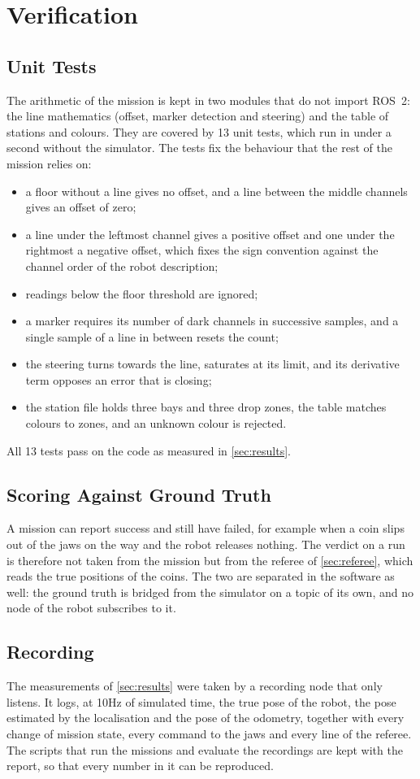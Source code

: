 \section{Verification}
\label{sec:verification}

\subsection{Unit Tests}
The arithmetic of the mission is kept in two modules that do not import ROS~2: the line
mathematics (offset, marker detection and steering) and the table of stations and colours.
They are covered by 13 unit tests, which run in under a second without the simulator. The
tests fix the behaviour that the rest of the mission relies on:
\begin{itemize}
  \item a floor without a line gives no offset, and a line between the middle channels gives
        an offset of zero;
  \item a line under the leftmost channel gives a positive offset and one under the
        rightmost a negative offset, which fixes the sign convention against the channel
        order of the robot description;
  \item readings below the floor threshold are ignored;
  \item a marker requires its number of dark channels in successive samples, and a single
        sample of a line in between resets the count;
  \item the steering turns towards the line, saturates at its limit, and its derivative
        term opposes an error that is closing;
  \item the station file holds three bays and three drop zones, the table matches colours
        to zones, and an unknown colour is rejected.
\end{itemize}
All 13 tests pass on the code as measured in \cref{sec:results}.

\subsection{Scoring Against Ground Truth}
A mission can report success and still have failed, for example when a coin slips out of
the jaws on the way and the robot releases nothing. The verdict on a run is therefore not
taken from the mission but from the referee of \cref{sec:referee}, which reads the true
positions of the coins. The two are separated in the software as well: the ground truth is
bridged from the simulator on a topic of its own, and no node of the robot subscribes to it.

\subsection{Recording}
The measurements of \cref{sec:results} were taken by a recording node that only listens. It
logs, at 10\unit{Hz} of simulated time, the true pose of the robot, the pose estimated by
the localisation and the pose of the odometry, together with every change of mission state,
every command to the jaws and every line of the referee. The scripts that run the missions
and evaluate the recordings are kept with the report, so that every number in it can be
reproduced.
